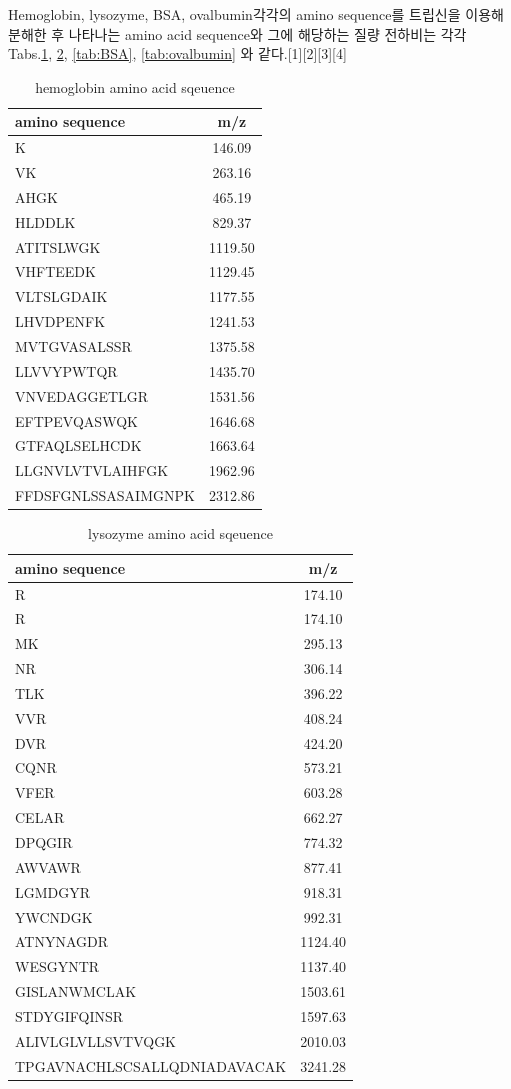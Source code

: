 \documentclass[%
 reprint,
 amsmath,amssymb,
 aps,
]{revtex4-2}
\begin{document}
Hemoglobin, lysozyme, BSA, ovalbumin각각의 amino sequence를 트립신을 이용해 분해한 후 나타나는 amino acid sequence와 그에 해당하는 질량 전하비는 각각 Tabs.\ref{tab:hemoglobin}, \ref{tab:lysozyme}, \ref{tab:BSA}, \ref{tab:ovalbumin} 와 같다.[1][2][3][4]

\begin{table}[h]
\caption{\label{tab:hemoglobin} hemoglobin amino acid sqeuence}
\begin{tabular}{l|c} \hline \hline
amino sequence & m/z \\ \hline
K & 146.09\\
VK & 263.16\\
AHGK & 465.19\\
HLDDLK & 829.37\\
ATITSLWGK & 1119.50\\
VHFTEEDK & 1129.45\\
VLTSLGDAIK & 1177.55\\
LHVDPENFK & 1241.53\\
MVTGVASALSSR & 1375.58\\
LLVVYPWTQR & 1435.70\\
VNVEDAGGETLGR & 1531.56\\
EFTPEVQASWQK & 1646.68\\
GTFAQLSELHCDK & 1663.64\\
LLGNVLVTVLAIHFGK & 1962.96\\
FFDSFGNLSSASAIMGNPK & 2312.86\\  \hline \hline 
\end{tabular}
\end{table}

\begin{table}[h]
\caption{\label{tab:lysozyme} lysozyme amino acid sqeuence}
\begin{tabular}{l|c} \hline \hline
amino sequence & m/z \\ \hline
R & 174.10\\
R & 174.10\\
MK & 295.13\\
NR & 306.14\\
TLK & 396.22\\
VVR & 408.24\\
DVR & 424.20\\
CQNR & 573.21\\
VFER & 603.28\\
CELAR & 662.27\\
DPQGIR & 774.32\\
AWVAWR & 877.41\\
LGMDGYR & 918.31\\
YWCNDGK & 992.31\\
ATNYNAGDR & 1124.40\\
WESGYNTR & 1137.40\\
GISLANWMCLAK & 1503.61\\
STDYGIFQINSR & 1597.63\\
ALIVLGLVLLSVTVQGK & 2010.03\\
TPGAVNACHLSCSALLQDNIADAVACAK & 3241.28\\  \hline \hline 
\end{tabular}
\end{table}
\end{document}
